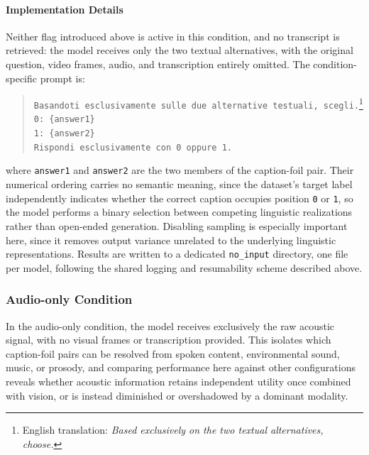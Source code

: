 \paragraph{Implementation Details}
Neither flag introduced above is active in this condition, and no transcript is retrieved: the model receives only the two textual alternatives, with the original question, video frames, audio, and transcription entirely omitted. The condition-specific prompt is:
\begin{quote}
\small
\texttt{Basandoti esclusivamente sulle due alternative testuali, scegli.}\footnote{English translation: \textit{Based exclusively on the two textual alternatives, choose.}}\\[0.5em]
\texttt{0: \{answer1\}}\\
\texttt{1: \{answer2\}}\\[0.5em]
\texttt{Rispondi esclusivamente con 0 oppure 1.}
\end{quote}
where \texttt{answer1} and \texttt{answer2} are the two members of the caption-foil pair. Their numerical ordering carries no semantic meaning, since the dataset's target label independently indicates whether the correct caption occupies position \texttt{0} or \texttt{1}, so the model performs a binary selection between competing linguistic realizations rather than open-ended generation.
Disabling sampling is especially important here, since it removes output variance unrelated to the underlying linguistic representations. Results are written to a dedicated \texttt{no\_input} directory, one file per model, following the shared logging and resumability scheme described above.
\subsubsection*{Audio-only Condition}
In the audio-only condition, the model receives exclusively the raw acoustic signal, with no visual frames or transcription provided. This isolates which caption-foil pairs can be resolved from spoken content, environmental sound, music, or prosody, and comparing performance here against other configurations reveals whether acoustic information retains independent utility once combined with vision, or is instead diminished or overshadowed by a dominant modality.
